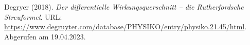 \begin{thebibliography}{99}
     Degryer (2018). \emph{Der differentielle Wirkungsquerschnitt – die Rutherfordsche Streuformel}. URL: \url{https://www.degruyter.com/database/PHYSIKO/entry/physiko.21.45/html}. Abgerufen am 19.04.2023. 
\end{thebibliography}